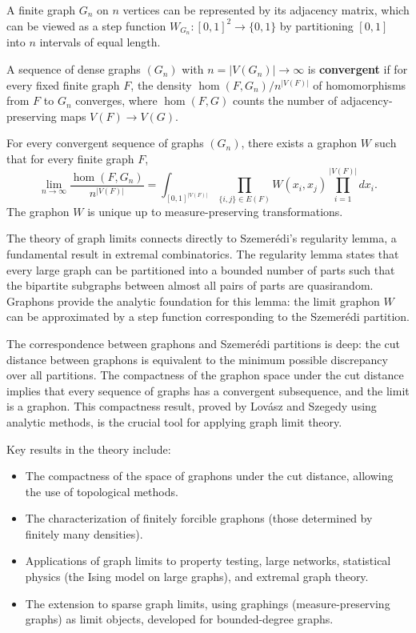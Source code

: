 A finite graph \(G_n\) on \(n\) vertices can be represented by its adjacency matrix, which can be viewed as a step function \(W_{G_n}: [0,1]^2 \to \{0,1\}\) by partitioning \([0,1]\) into \(n\) intervals of equal length.

\begin{definition}
A sequence of dense graphs \((G_n)\) with \(n = |V(G_n)| \to \infty\) is \textbf{convergent} if for every fixed finite graph \(F\), the density \(\hom(F, G_n) / n^{|V(F)|}\) of homomorphisms from \(F\) to \(G_n\) converges, where \(\hom(F,G)\) counts the number of adjacency-preserving maps \(V(F) \to V(G)\).
\end{definition}

\begin{theorem}
For every convergent sequence of graphs \((G_n)\), there exists a graphon \(W\) such that for every finite graph \(F\),
\[
\lim_{n \to \infty} \frac{\hom(F, G_n)}{n^{|V(F)|}} = \int_{[0,1]^{|V(F)|}} \prod_{\{i,j\} \in E(F)} W(x_i, x_j) \prod_{i=1}^{|V(F)|} dx_i.
\]
The graphon \(W\) is unique up to measure-preserving transformations.
\end{theorem}

The theory of graph limits connects directly to Szemer\'{e}di's regularity lemma, a fundamental result in extremal combinatorics. The regularity lemma states that every large graph can be partitioned into a bounded number of parts such that the bipartite subgraphs between almost all pairs of parts are quasirandom. Graphons provide the analytic foundation for this lemma: the limit graphon \(W\) can be approximated by a step function corresponding to the Szemer\'{e}di partition.

The correspondence between graphons and Szemer\'{e}di partitions is deep: the cut distance between graphons is equivalent to the minimum possible discrepancy over all partitions. The compactness of the graphon space under the cut distance implies that every sequence of graphs has a convergent subsequence, and the limit is a graphon. This compactness result, proved by Lov\'{a}sz and Szegedy using analytic methods, is the crucial tool for applying graph limit theory.

Key results in the theory include:
\begin{itemize}
  \item The compactness of the space of graphons under the cut distance, allowing the use of topological methods.
  \item The characterization of finitely forcible graphons (those determined by finitely many densities).
  \item Applications of graph limits to property testing, large networks, statistical physics (the Ising model on large graphs), and extremal graph theory.
  \item The extension to sparse graph limits, using graphings (measure-preserving graphs) as limit objects, developed for bounded-degree graphs.
\end{itemize}


